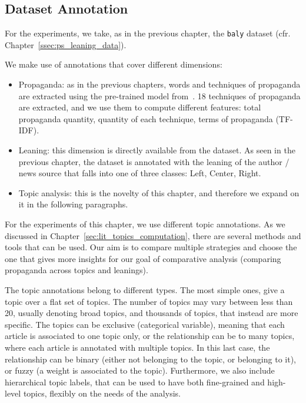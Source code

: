 \subsection{\statusgreen Dataset Annotation}
\label{sec:topic_method_data}

For the experiments, we take, as in the previous chapter, the \texttt{baly} dataset (cfr. Chapter~\ref{ssec:ps_leaning_data}).

We make use of annotations that cover different dimensions:
\begin{itemize}
    \item Propaganda: as in the previous chapters, words and techniques of propaganda are extracted using the pre-trained model from~\citet{da2019fine}. 18 techniques of propaganda are extracted, and we use them to compute different features: total propaganda quantity, quantity of each technique, terms of propaganda (TF-IDF).
    \item Leaning: this dimension is directly available from the dataset. As seen in the previous chapter, the dataset is annotated with the leaning of the author / news source that falls into one of three classes: Left, Center, Right.
    \item Topic analysis: this is the novelty of this chapter, and therefore we expand on it in the following paragraphs. %
\end{itemize}



For the experiments of this chapter, we use different topic annotations. As we discussed in Chapter~\ref{sec:lit_topics_computation}, there are several methods and tools that can be used.
Our aim is to compare multiple strategies and choose the one that gives more insights for our goal of comparative analysis (comparing propaganda across topics and leanings).

The topic annotations belong to different types. The most simple ones, give a topic over a flat set of topics. The number of topics may vary between less than 20, usually denoting broad topics, and thousands of topics, that instead are more specific.
The topics can be exclusive (categorical variable), meaning that each article is associated to one topic only, or the relationship can be to many topics, where each article is annotated with multiple topics. In this last case, the relationship can be binary (either not belonging to the topic, or belonging to it), or fuzzy (a weight is associated to the topic).
Furthermore, we also include hierarchical topic labels, that can be used to have both fine-grained and high-level topics, flexibly on the needs of the analysis.

